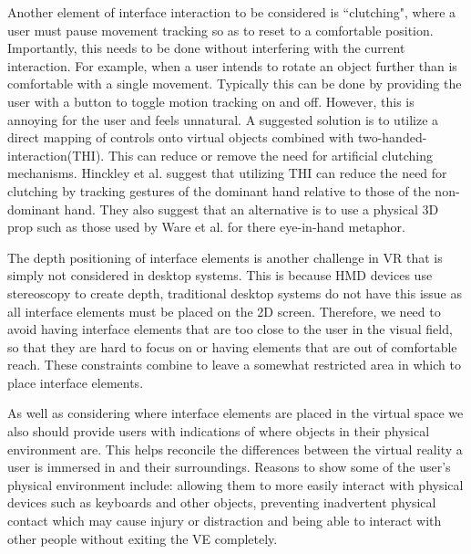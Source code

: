 \documentclass{sig-alternate-05-2015}
\begin{document}
 Another element of interface interaction to be considered is ``clutching", where a user must pause movement tracking so as to reset to a comfortable position\cite{Hand1997}. Importantly, this needs to be done without interfering with the current interaction. For example, when a user intends to rotate an object further than is comfortable with a single movement. Typically this can be done by providing the user with a button to toggle motion tracking on and off. However, this is annoying for the user and feels unnatural\cite{Hand1997}.  A suggested solution is to utilize a direct mapping of controls onto virtual objects combined with two-handed-interaction(THI). This can reduce or remove the need for artificial clutching mechanisms.\cite{Hand1997}  Hinckley et al. suggest that utilizing THI can reduce the need for clutching by tracking gestures of the dominant hand relative to those of the non-dominant hand.\cite{Hinckley1994} They also suggest that an alternative is to use a physical 3D prop such as those used by Ware et al. for there eye-in-hand metaphor\cite{Ware1990}.
 
 The depth positioning of interface elements is another challenge in VR that is simply not considered in desktop systems.\cite{alger2015visual} This is because HMD devices use stereoscopy to create depth, traditional desktop systems do not have this issue as all interface elements must be placed on the 2D screen. Therefore, we need to avoid having interface elements that are too close to the user in the visual field, so that they are hard to focus on or having elements that are out of comfortable reach. These constraints combine to leave a somewhat restricted area in which to place interface elements.
 
As well as considering where interface elements are placed in the virtual space we also should provide users with indications of where objects in their physical environment are. This helps reconcile the differences between the virtual reality a user is immersed in and their surroundings\cite{Duval2014}. Reasons to show some of the user's physical environment include: allowing them to more easily interact with physical devices such as keyboards and other objects, preventing inadvertent physical contact which may cause injury or distraction and being able to interact with other people without exiting the VE completely.
 
\end{document}
